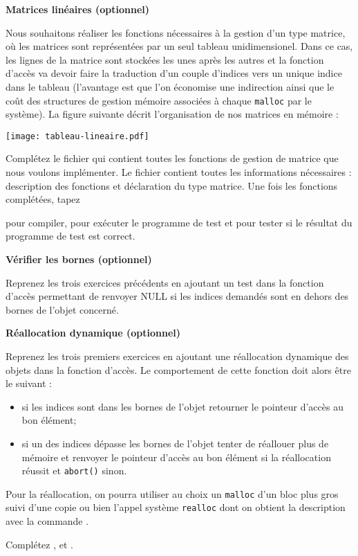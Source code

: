 \documentclass[10pt]{article}\usepackage[enonce]{exemptty}
\begin{document}
\begin{Exercice} \textbf{Matrices linéaires (optionnel)} 

  Nous souhaitons réaliser les fonctions nécessaires à la gestion d'un type
  matrice, où les matrices sont représentées par un seul tableau
  unidimensionel. Dans ce cas, les lignes de la matrice sont stockées les unes
  après les autres et la fonction d'accès va devoir faire la traduction d'un
  couple d'indices vers un unique indice dans le tableau (l'avantage est que
  l'on économise une indirection ainsi que le coût des structures de gestion
  mémoire associées à chaque \texttt{malloc} par le système). La figure
  suivante décrit l'organisation de nos matrices en mémoire :

  \centerline{\texttt{[image: tableau-lineaire.pdf]}}

  Complétez le fichier  qui contient toutes les
  fonctions de gestion de matrice que nous voulons implémenter. Le fichier
   contient toutes les informations nécessaires :
  description des fonctions et déclaration du type matrice. Une fois les
  fonctions complétées, tapez
  
  \noindent{} pour
  compiler,  pour exécuter le programme de
  test et  pour tester si le résultat du programme de test est
  correct.
\end{Exercice}

\begin{Exercice} \textbf{Vérifier les bornes (optionnel)}

  Reprenez les trois exercices précédents en ajoutant un test dans la fonction
  d'accès permettant de renvoyer NULL si les indices demandés sont en dehors
  des bornes de l'objet concerné.
\end{Exercice}

\begin{Exercice} \textbf{Réallocation dynamique (optionnel)}

  Reprenez les trois premiers exercices en ajoutant une réallocation dynamique
  des objets dans la fonction d'accès. Le comportement de cette fonction doit
  alors être le suivant :
  \begin{itemize}
  \item si les indices sont dans les bornes de l'objet retourner le pointeur
    d'accès au bon élément;
  \item si un des indices dépasse les bornes de l'objet tenter de réallouer
    plus de mémoire et renvoyer le pointeur d'accès au bon élément si la
    réallocation réussit et \verb~abort()~ sinon.
  \end{itemize}
  
  Pour la réallocation, on pourra utiliser au choix un \texttt{malloc} d'un
  bloc plus gros suivi d'une copie ou bien l'appel système \texttt{realloc}
  dont on obtient la description avec la commande .

  Complétez ,  et
  .
\end{Exercice}
\end{document}
